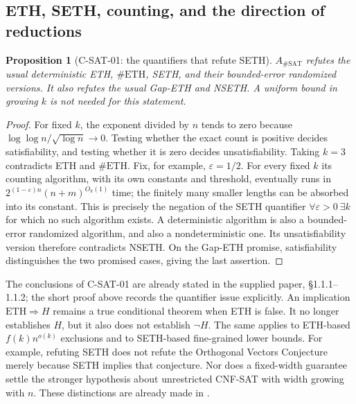 \documentclass[11pt,a4paper]{article}
\newtheorem{proposition}{Proposition}[section]
\begin{document}
\subsection{ETH, SETH, counting, and the direction of reductions}

\begin{proposition}[C-SAT-01: the quantifiers that refute SETH]
\(A_{\#\mathrm{SAT}}\) refutes the usual deterministic ETH, \(\#\mathrm{ETH}\),
SETH, and their bounded-error randomized versions.  It also refutes the
usual Gap-ETH and NSETH.  A uniform bound in growing \(k\) is not needed
for this statement.
\end{proposition}
\begin{proof}
For fixed \(k\), the exponent divided by \(n\) tends to zero because
\(\log\log n/\sqrt{\log n}\to0\).  Testing whether the exact count is
positive decides satisfiability, and testing whether it is zero decides
unsatisfiability.  Taking \(k=3\) contradicts ETH and \(\#\mathrm{ETH}\).
Fix, for example, \(\varepsilon=1/2\).  For every fixed \(k\) its counting
algorithm, with its own constants and threshold, eventually runs in
\(2^{(1-\varepsilon)n}(n+m)^{O_k(1)}\) time; the finitely many smaller
lengths can be absorbed into its constant.  This is precisely the
negation of the SETH quantifier
\(\forall\varepsilon>0\ \exists k\) for which no such algorithm exists.
A deterministic algorithm is also a bounded-error randomized algorithm,
and also a nondeterministic one.  Its unsatisfiability version therefore
contradicts NSETH.  On the Gap-ETH promise, satisfiability distinguishes
the two promised cases, giving the last assertion.
\end{proof}

The conclusions of C-SAT-01 are already stated in the supplied paper,
\S1.1.1--1.1.2; the short proof above records the quantifier issue explicitly.
An implication \(\mathrm{ETH}\Rightarrow H\) remains a true conditional
theorem when ETH is false.  It no longer establishes \(H\), but it also
does not establish \(\neg H\).  The same applies to ETH-based
\(f(k)n^{o(k)}\) exclusions and to SETH-based fine-grained lower bounds.
For example, refuting SETH does not refute the Orthogonal Vectors
Conjecture merely because SETH implies that conjecture.  Nor does a
fixed-width guarantee settle the stronger hypothesis about unrestricted
CNF-SAT with width growing with \(n\).  These distinctions are already
made in \cite[\S1.1.3]{COAI26}.
\end{document}
